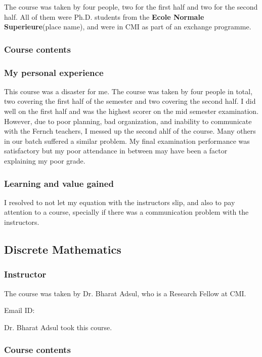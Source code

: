 \documentclass[a4paper]{amsart}
\newcommand{\placename}[1]{{\bf #1}{\small{(place name)}}\index{#1}}
\begin{document}
The course was taken by four people, two for the first half and two
for the second half. All of them were Ph.D. students from the
\placename{Ecole Normale Superieure}, and were in CMI as part of an
exchange programme.

\subsubsection{Course contents}

\subsubsection{My personal experience}

This course was a disaster for me. The course was taken by four people
in total, two covering the first half of the semester and two covering
the second half. I did well on the first half and was the highest
scorer on the mid semester examination. However, due to poor planning,
bad organization, and inability to communicate with the Fernch
teachers, I messed up the second ahlf of the course. Many others in
our batch suffered a similar problem. My final examination performance
was satisfactory but my poor attendance in between may have been a
factor explaining my poor grade.

\subsubsection{Learning and value gained}

I resolved to not let my equation with the instructors slip, and also to pay attention to a course, specially if there was a communication
problem with the instructors.

\subsection{Discrete Mathematics}\label{dmath}

\subsubsection{Instructor}

The course was taken by Dr. Bharat Adsul, who is a Research Fellow at CMI.

Email ID: 

Dr. Bharat Adsul took this course. 

\subsubsection{Course contents}
\end{document}
